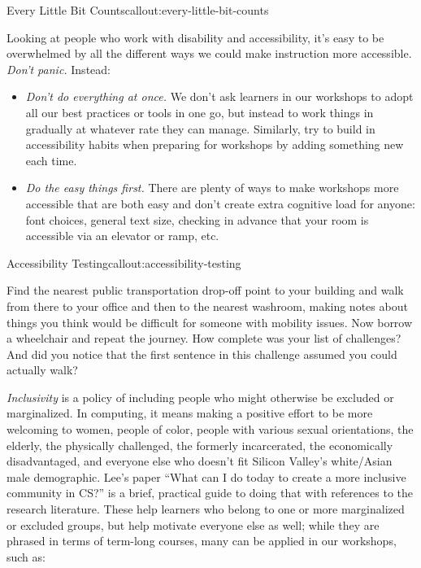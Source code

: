 \begin{callout}{Every Little Bit Counts}{callout:every-little-bit-counts}

Looking at people who work with disability and accessibility, it's easy
to be overwhelmed by all the different ways we could make instruction
more accessible. \emph{Don't panic.} Instead:

\begin{itemize}
\item
  \emph{Don't do everything at once.} We don't ask learners in our
  workshops to adopt all our best practices or tools in one go, but
  instead to work things in gradually at whatever rate they can manage.
  Similarly, try to build in accessibility habits when preparing for
  workshops by adding something new each time.
\item
  \emph{Do the easy things first.} There are plenty of ways to make
  workshops more accessible that are both easy and don't create extra
  cognitive load for anyone: font choices, general text size, checking
  in advance that your room is accessible via an elevator or ramp, etc.
\end{itemize}
\end{callout}

\begin{callout}{Accessibility Testing}{callout:accessibility-testing}

Find the nearest public transportation drop-off point to your building
and walk from there to your office and then to the nearest washroom,
making notes about things you think would be difficult for someone with
mobility issues. Now borrow a wheelchair and repeat the journey. How
complete was your list of challenges? And did you notice that the first
sentence in this challenge assumed you could actually walk?
\end{callout}


\emph{Inclusivity} is a policy of including people who might otherwise
be excluded or marginalized. In computing, it means making a positive
effort to be more welcoming to women, people of color, people with
various sexual orientations, the elderly, the physically challenged, the
formerly incarcerated, the economically disadvantaged, and everyone else
who doesn't fit Silicon Valley's white/Asian male demographic. Lee's
paper
``What can I do today to create a more inclusive community in CS?''
\cite{bib:lee-create-inclusive-community}
is a brief, practical guide to
doing that with references to the research literature. These help
learners who belong to one or more marginalized or excluded groups, but
help motivate everyone else as well; while they are phrased in terms of
term-long courses, many can be applied in our workshops, such as:

